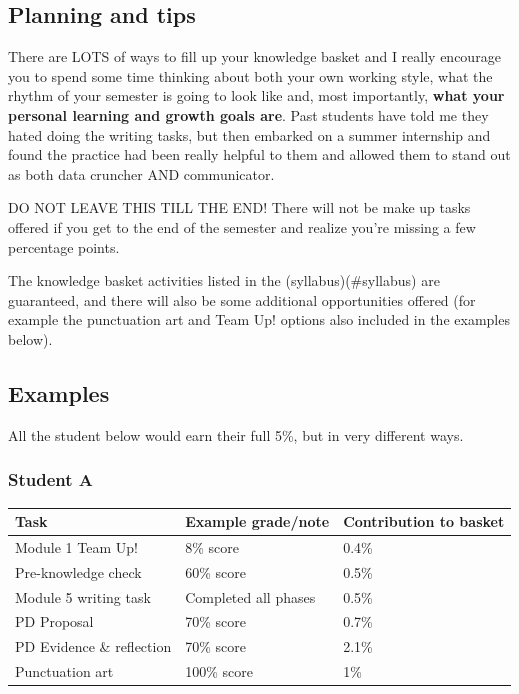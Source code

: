 \documentclass[
  openany]{book}
\begin{document}
\hypertarget{planning-and-tips}{%
\subsection{Planning and tips}\label{planning-and-tips}}

There are LOTS of ways to fill up your knowledge basket and I really encourage you to spend some time thinking about both your own working style, what the rhythm of your semester is going to look like and, most importantly, \textbf{what your personal learning and growth goals are}. Past students have told me they hated doing the writing tasks, but then embarked on a summer internship and found the practice had been really helpful to them and allowed them to stand out as both data cruncher AND communicator.

DO NOT LEAVE THIS TILL THE END! There will not be make up tasks offered if you get to the end of the semester and realize you're missing a few percentage points.

The knowledge basket activities listed in the (syllabus)(\#syllabus) are guaranteed, and there will also be some additional opportunities offered (for example the punctuation art and Team Up! options also included in the examples below).

\hypertarget{examples}{%
\subsection{Examples}\label{examples}}

All the student below would earn their full 5\%, but in very different ways.

\hypertarget{student-a}{%
\subsubsection{Student A}\label{student-a}}

\begin{longtable}[]{@{}lll@{}}
\toprule
Task & Example grade/note & Contribution to basket \\
\midrule
\endhead
Module 1 Team Up! & 8\% score & 0.4\% \\
Pre-knowledge check & 60\% score & 0.5\% \\
Module 5 writing task & Completed all phases & 0.5\% \\
PD Proposal & 70\% score & 0.7\% \\
PD Evidence \& reflection & 70\% score & 2.1\% \\
Punctuation art & 100\% score & 1\% \\
\bottomrule
\end{longtable}
\end{document}
